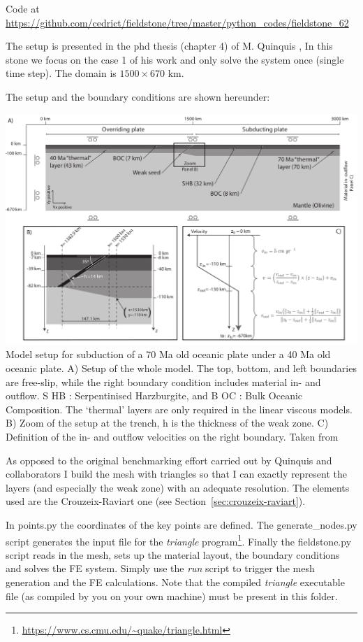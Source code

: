 
Code at \url{https://github.com/cedrict/fieldstone/tree/master/python_codes/fieldstone_62}

The setup is presented in the phd thesis (chapter 4) of M. Quinquis \cite{quin14},
In this stone we focus on the case 1 of his work and only solve the system once (single time step).
The domain is $1500\times 670$ km. 

The setup and the boundary conditions are shown hereunder:
\begin{center}
\includegraphics[width=\linewidth]{python_codes/fieldstone_62/images/quin14_setup}\\
{\captionfont Model setup for subduction of a 70 Ma old oceanic plate under a 40 Ma
old oceanic plate. A) Setup of the whole model. The top, bottom, and left boundaries
are free-slip, while the right boundary condition includes material in- and outflow. S HB :
Serpentinised Harzburgite, and B OC : Bulk Oceanic Composition. The ‘thermal’ layers
are only required in the linear viscous models. B) Zoom of the setup at the trench, h is the
thickness of the weak zone. C) Definition of the in- and outflow velocities on the right
boundary. Taken from \cite{quin14}}
\end{center}

As opposed to the original benchmarking effort carried out by Quinquis and collaborators
I build the mesh with triangles so that I can exactly represent the layers (and especially 
the weak zone) with an adequate resolution. The elements used are the Crouzeix-Raviart one
(see Section~\ref{sec:crouzeix-raviart}). 

In {points.py} the coordinates of the key points are defined. The {generate\_nodes.py}
script generates the input file for 
the {\sl triangle} program\footnote{\url{https://www.cs.cmu.edu/~quake/triangle.html}}. 
Finally the {fieldstone.py} script 
reads in the mesh, sets up the material layout, the boundary conditions and solves the 
FE system. Simply use the {\sl run} script to trigger the mesh generation and the FE 
calculations.  
Note that the compiled {\sl triangle} executable file (as compiled by you 
on your own machine) must be present in this folder.

